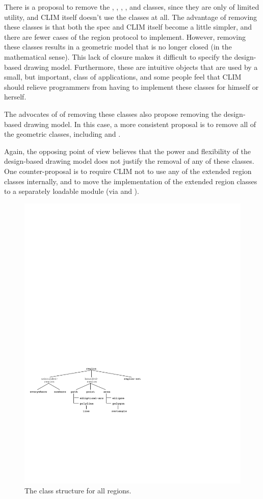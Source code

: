  {There is a proposal to remove the ,
, , , and  classes, since
they are only of limited utility, and CLIM itself doesn't use the classes at
all.  The advantage of removing these classes is that both the spec and CLIM
itself become a little simpler, and there are fewer cases of the region protocol
to implement.  However, removing these classes results in a geometric model that
is no longer closed (in the mathematical sense).  This lack of closure makes it
difficult to specify the design-based drawing model.  Furthermore, these are
intuitive objects that are used by a small, but important, class of
applications, and some people feel that CLIM should relieve programmers from
having to implement these classes for himself or herself.

The advocates of of removing these classes also propose removing the
design-based drawing model.  In this case, a more consistent proposal is to
remove all of the geometric classes, including  and .

Again, the opposing point of view believes that the power and flexibility of the
design-based drawing model does not justify the removal of any of these classes.
One counter-proposal is to require CLIM not to use any of the extended region
classes internally, and to move the implementation of the extended region
classes to a separately loadable module (via  and ).}

\begin{figure}
\centerline{\includegraphics{region-structure}}
\caption{The class structure for all regions.}
\end{figure}


